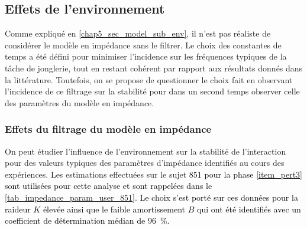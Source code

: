 \subsection{Effets de l'environnement} \label{chap5_sec_stability_study_sub_env}

Comme expliqué en \cref{chap5_sec_model_sub_env}, il n'est pas réaliste de considérer le modèle en impédance sans le filtrer. Le choix des constantes de temps a été défini pour minimiser l'incidence sur les fréquences typiques de la tâche de jonglerie, tout en restant cohérent par rapport aux résultats donnés dans la littérature. Toutefois, on se propose de questionner le choix fait en observant l'incidence de ce filtrage sur la stabilité pour dans un second temps observer celle des paramètres du modèle en impédance. 

\subsubsection{Effets du filtrage du modèle en impédance} \label{chap5_sec_stability_study_sub_env_1}

On peut étudier l'influence de l'environnement sur la stabilité de l'interaction pour des valeurs typiques des paramètres d'impédance identifiés au cours des expériences. Les estimations effectuées sur le sujet \textcolor{black}{851 pour la phase \cref{item_pert3} sont utilisées pour cette analyse et sont rappelées dans le \cref{tab_impedance_param_user_851}. Le choix s'est porté sur ces données pour la raideur $K$ élevée ainsi que le faible amortissement $B$ qui ont été identifiés avec un coefficient de détermination médian de \SI{96}{\percent}.}

